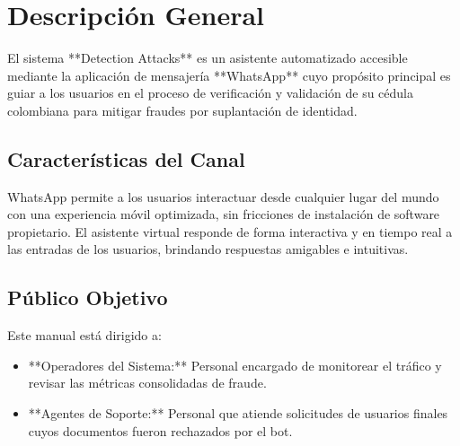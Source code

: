 \section{Descripción General}
\label{sec:overview}

El sistema **Detection Attacks** es un asistente automatizado accesible mediante la aplicación de mensajería **WhatsApp** cuyo propósito principal es guiar a los usuarios en el proceso de verificación y validación de su cédula colombiana para mitigar fraudes por suplantación de identidad.

\subsection{Características del Canal}
WhatsApp permite a los usuarios interactuar desde cualquier lugar del mundo con una experiencia móvil optimizada, sin fricciones de instalación de software propietario. El asistente virtual responde de forma interactiva y en tiempo real a las entradas de los usuarios, brindando respuestas amigables e intuitivas.

\subsection{Público Objetivo}
Este manual está dirigido a:
\begin{itemize}
    \item **Operadores del Sistema:** Personal encargado de monitorear el tráfico y revisar las métricas consolidadas de fraude.
    \item **Agentes de Soporte:** Personal que atiende solicitudes de usuarios finales cuyos documentos fueron rechazados por el bot.
\end{itemize}
